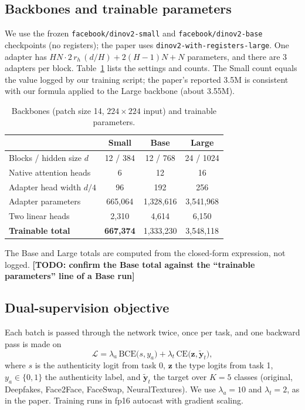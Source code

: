 \documentclass[lettersize,journal]{IEEEtran}
\newcommand{\todo}[1]{\textbf{[TODO: #1]}}
\begin{document}
\subsection{Backbones and trainable parameters}
We use the frozen \texttt{facebook/dinov2-small} and \texttt{facebook/dinov2-base} checkpoints (no registers); the paper uses \texttt{dinov2-with-registers-large}. One adapter has $H N\cdot 2\,r_h\,(d/H)+2(H{-}1)N+N$ parameters, and there are $3$ adapters per block. Table~\ref{tab:bb} lists the settings and counts. The Small count equals the value logged by our training script; the paper's reported 3.5M is consistent with our formula applied to the Large backbone (about 3.55M).
\begin{table}[!t]
\caption{Backbones (patch size 14, $224\times224$ input) and trainable parameters.\label{tab:bb}}
\centering
\footnotesize
\setlength{\tabcolsep}{3pt}
\begin{tabular}{|l||c|c|c|}
\hline
 & Small & Base & Large\\
\hline
Blocks / hidden size $d$ & 12 / 384 & 12 / 768 & 24 / 1024\\
Native attention heads & 6 & 12 & 16\\
Adapter head width $d/4$ & 96 & 192 & 256\\
Adapter parameters & 665{,}064 & 1{,}328{,}616 & 3{,}541{,}968\\
Two linear heads & 2{,}310 & 4{,}614 & 6{,}150\\
\textbf{Trainable total} & \textbf{667{,}374} & 1{,}333{,}230 & 3{,}548{,}118\\
\hline
\end{tabular}
\end{table}
The Base and Large totals are computed from the closed-form expression, not logged. \todo{confirm the Base total against the ``trainable parameters'' line of a Base run}

\subsection{Dual-supervision objective}
Each batch is passed through the network twice, once per task, and one backward pass is made on
\begin{equation}
\mathcal{L}=\lambda_a\,\mathrm{BCE}\big(s,y_a\big)+\lambda_t\,\mathrm{CE}\big(\mathbf{z},\tilde{\mathbf{y}}_t\big),
\label{eq:loss}
\end{equation}
where $s$ is the authenticity logit from task 0, $\mathbf{z}$ the type logits from task 1, $y_a\in\{0,1\}$ the authenticity label, and $\tilde{\mathbf{y}}_t$ the target over $K=5$ classes (original, Deepfakes, Face2Face, FaceSwap, NeuralTextures). We use $\lambda_a=10$ and $\lambda_t=2$, as in the paper. Training runs in fp16 autocast with gradient scaling.
\end{document}
